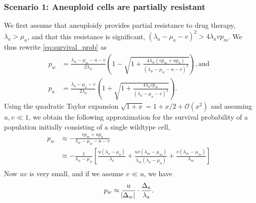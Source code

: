 \documentclass[12pt]{extarticle}
\begin{document}
\begin{appendices}
\subsubsection*{Scenario 1: Aneuploid cells are partially resistant} 

We first assume that aneuploidy provides partial resistance to drug therapy, $\lambda_a>\mu_a$, and that this resistance is significant, $\left(\lambda_a-\mu_a-v\right)^2 > 4\lambda_a v p_m$.
We thus rewrite \cref{eq:survival_prob} as
\begin{align*}
p_w&=\frac{\lambda_w-\mu_w-u-v}{2\lambda_w}\left(1-\sqrt{1+\frac{4\lambda_w\left(vp_m+up_a\right)}{\left(\lambda_w-\mu_w-u-v\right)^2}}\right) ,
\text{and} \\
p_a&=\frac{\lambda_a-\mu_a-v}{2\lambda_a}\left(1+\sqrt{1+\frac{4\lambda_avp_m}{\left(\lambda_a-\mu_a-v\right)^2}}\right) . 
\end{align*}
Using the quadratic Taylor expansion $\sqrt{1+x}=1+x/2+\mathcal{O}(x^2)$ and assuming $u,v \ll 1$,
we obtain the following approximation for the survival probability of a population initially consisting of a single wildtype cell,
\begin{align} \label{eq:survprobwapprox1}
p_w 
&\approx -\frac{vp_m+up_a}{\lambda_w-\mu_w-u-v}\\
\nonumber
&\approx-\frac{1}{\lambda_w-\mu_w}\left[\frac{u\left(\lambda_a-\mu_a\right)}{\lambda_a}+\frac{uv\left(\lambda_m-\mu_m\right)}{\lambda_m\left(\lambda_a-\mu_a\right)}+\frac{v\left(\lambda_m-\mu_m\right)}{\lambda_m}\right]\\
\end{align}
Now $u v$ is very small, and if we assume $v \ll u$, we have
\begin{equation}
p_w \approx \frac{u}{\abs{\Delta_w}} \cdot \frac{\Delta_a}{\lambda_a} .
\end{equation}


\end{appendices}
\end{document}
